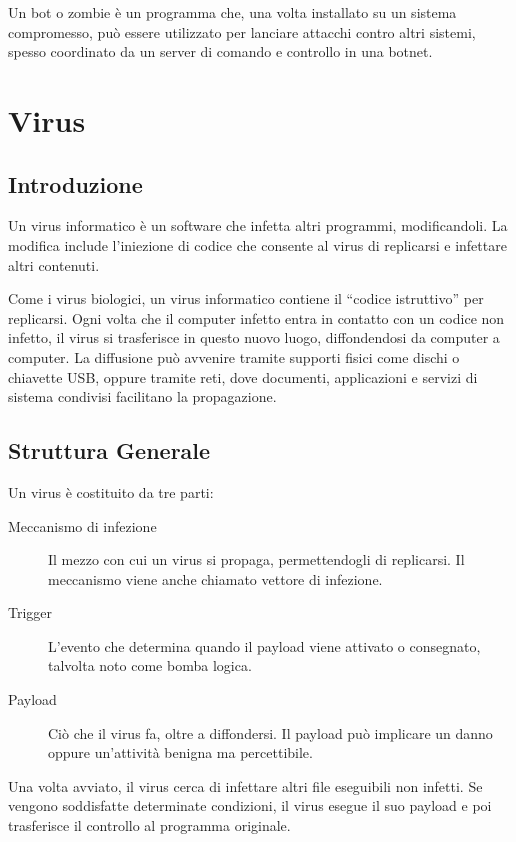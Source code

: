 Un bot o zombie è un programma che, una volta installato su un sistema compromesso, può essere utilizzato per lanciare attacchi contro altri sistemi, spesso coordinato da un server di comando e controllo in una botnet.

\section{Virus}

\subsection{Introduzione}

Un virus informatico è un software che infetta altri programmi, modificandoli. La modifica include l'iniezione di codice che consente al virus di replicarsi e infettare altri contenuti.

Come i virus biologici, un virus informatico contiene il ``codice istruttivo'' per replicarsi. Ogni volta che il computer infetto entra in contatto con un codice non infetto, il virus si trasferisce in questo nuovo luogo, diffondendosi da computer a computer. La diffusione può avvenire tramite supporti fisici come dischi o chiavette USB, oppure tramite reti, dove documenti, applicazioni e servizi di sistema condivisi facilitano la propagazione.

\subsection{Struttura Generale}

Un virus è costituito da tre parti:

\begin{description}
    \item[Meccanismo di infezione] Il mezzo con cui un virus si propaga, permettendogli di replicarsi. Il meccanismo viene anche chiamato vettore di infezione.
    \item[Trigger] L'evento che determina quando il payload viene attivato o consegnato, talvolta noto come bomba logica.
    \item[Payload] Ciò che il virus fa, oltre a diffondersi. Il payload può implicare un danno oppure un'attività benigna ma percettibile.
\end{description}

Una volta avviato, il virus cerca di infettare altri file eseguibili non infetti. Se vengono soddisfatte determinate condizioni, il virus esegue il suo payload e poi trasferisce il controllo al programma originale.

